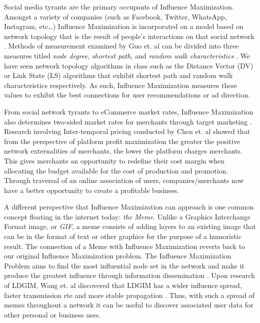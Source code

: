 \documentclass[12pt]{article}
\begin{document}
Social media tyrants are the primary occupants of Influence Maximization. 
Amongst a variety of companies (such as Facebook, Twitter, WhatsApp, Instagram, etc\ldots) Influence Maximization is incorporated on a model based on network topology that is the result of people's interactions on that social network \cite{9045797}. 
Methods of measurement examined by Guo et. al can be divided into three measures titled \emph{node degree}, \emph{shortest path}, and \emph{random walk characteristics} \cite{9045797}. 
We have seen network topology algorithms in class such as the Distance Vector (DV) or Link State (LS) algorithms that exhibit shortest path and random walk characteristics respectively. 
As such, Influence Maximization measures these values to exhibit the best connections for user recommendations or ad direction.

From social network tyrants to eCommerce market rates, Influence Maximization also determines two-sided market rates for merchants through target marketing \cite{8681423}. 
Research involving Inter-temporal pricing conducted by Chen et. al \cite{9188557} showed that from the perspective of platform profit maximization the greater the positive network externalities of merchants, the lower the platform charges merchants. 
This gives merchants an opportunity to redefine their cost margin when allocating the budget available for the cost of production and promotion. 
Through traversal of an online association of users, companies/merchants now have a better opportunity to create a profitable business.

A different perspective that Influence Maximization can approach is one common concept floating in the internet today: \emph{the Meme}. 
Unlike a Graphics Interchange Format image, or \emph{GIF}, a meme consists of adding layers to an existing image that can be in the format of text or other graphics for the purpose of a humoristic result. 
The connection of a Meme with Influence Maximization reverts back to our original Influence Maximization problem. 
The Influence Maximization Problem aims to find the most influential node set in the network and make it produce the greatest influence through information dissemination \cite{9695654}. 
Upon research of LDGIM, Wang et. al discovered that LDGIM has a wider influence spread, faster transmission rte and more stable propagation \cite{9695654}. 
Thus, with such a spread of memes throughout a network it can be useful to discover associated user data for other personal or business uses.
\end{document}
